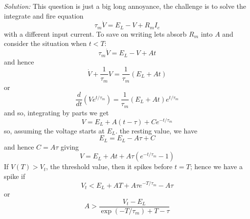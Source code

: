 \documentclass[12pt]{article}
\newcommand\soln{\noindent\textit{Solution:} }
\begin{document}
\begin{enumerate}
\soln This question is just a big long annoyance, the challenge is to solve the integrate and fire equation 
\begin{equation}
\tau_m \dot{V}=E_L-V+R_mI_e
\end{equation}
with a different input current. To save on writing lets absorb $R_m$ into $A$ and consider the situation when $t<T$:
\begin{equation}
\tau_m \dot{V}=E_L-V+At
\end{equation}
and hence
\begin{equation}
\dot{V}+\frac{1}{\tau_m}V=\frac{1}{\tau_m}\left(E_L+At\right)
\end{equation}
or
\begin{equation}
\frac{d}{dt}\left(Ve^{t/\tau_m}\right)=\frac{1}{\tau_m}\left(E_L+At\right)e^{t/\tau_m}
\end{equation}
and so, integrating by parts we get
\begin{equation}
V=E_L+A(t-\tau)+Ce^{-t/\tau_m}
\end{equation}
so, assuming the voltage starts at $E_L$. the resting value, we have 
\begin{equation}
E_L=E_L-A\tau+C
\end{equation}
and hence $C=A\tau$ giving
\begin{equation}
V=E_L+At+A\tau\left(e^{-t/\tau_m}-1\right)
\end{equation}
If $V(T)>V_t$, the threshold value, then it spikes before $t=T$; hence we have a spike if
\begin{equation}
V_t<E_L+AT+A\tau e^{-T/\tau_m}-A\tau
\end{equation}
or
\begin{equation}
A>\frac{V_t-E_L}{\exp{(-T/\tau_m)}+T-\tau}
\end{equation}


\end{enumerate}
\end{document}
